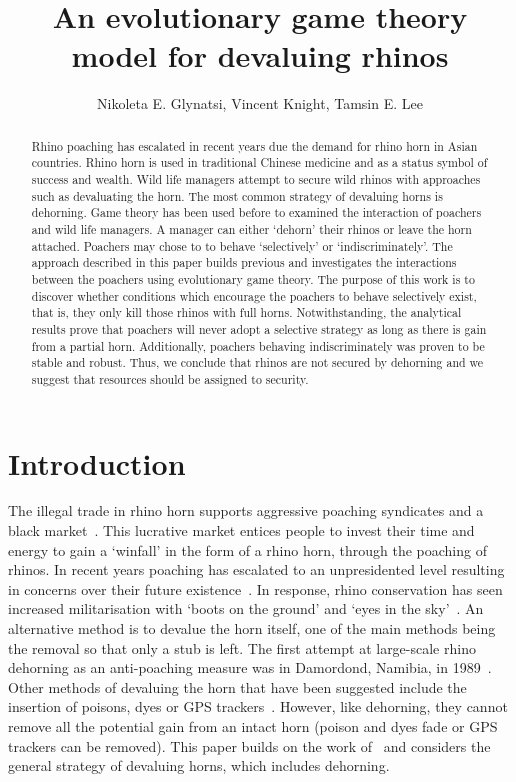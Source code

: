 \documentclass[10pt]{article}
\title{An evolutionary game theory model for devaluing rhinos}
\author{Nikoleta E. Glynatsi, Vincent Knight, Tamsin E. Lee} %
\date{}
\begin{document}
\maketitle

\begin{abstract}

Rhino poaching has escalated in recent years due the demand for rhino horn in 
Asian countries. Rhino horn is used in traditional Chinese medicine and as a 
status symbol of success and wealth. Wild life managers attempt to secure
wild rhinos with approaches such as devaluating the horn. 
The  most common strategy of devaluing horns is dehorning. Game theory has
been used before to examined the interaction of poachers and
wild life managers.  A manager can either `dehorn' their rhinos or leave the
horn attached. Poachers may chose to to behave `selectively' or `indiscriminately'.
The approach described in this paper builds previous and investigates 
the interactions  between the poachers using evolutionary game theory. 
The purpose of this work is to discover whether conditions which encourage
the poachers to behave selectively exist, that is, they only kill those rhinos with
full horns. Notwithstanding, the analytical results prove that poachers will never
adopt a selective strategy as long as there is gain from a partial horn. 
Additionally, poachers behaving indiscriminately was proven to be stable and 
robust. Thus, we conclude that  rhinos are not secured by dehorning 
and we suggest that resources should be assigned to security.

\end{abstract}

\section{Introduction}\label{section:introduction}

The illegal trade in rhino horn supports aggressive poaching syndicates and a 
black market~\cite{Nowell1992}. This lucrative market entices people to invest
their time and energy to gain a `winfall' in the form of a rhino horn, through the 
poaching of rhinos. In recent years poaching has escalated to an unpresidented 
level resulting in concerns over their future existence~\cite{Smith1993}. In 
response, rhino conservation has seen increased  militarisation with `boots on the 
ground' and `eyes in the sky'~\cite{duffy_st}. An alternative method is to 
devalue the horn itself, one of the main  methods being the removal so that only
a stub is left. The first attempt at large-scale rhino dehorning as an anti-poaching
measure was in Damordond,  Namibia, in 1989~\cite{Milner1992}. Other methods
of devaluing the horn that have been suggested include
the insertion of poisons, dyes or GPS trackers~\cite{Gill2010,Smith1993}. However, 
like dehorning, they cannot remove all the potential gain from an intact horn 
(poison and dyes fade or GPS trackers can be removed). This paper builds on 
the work of~\cite{Lee} and considers the general strategy of devaluing horns,
which includes dehorning.
\end{document}

